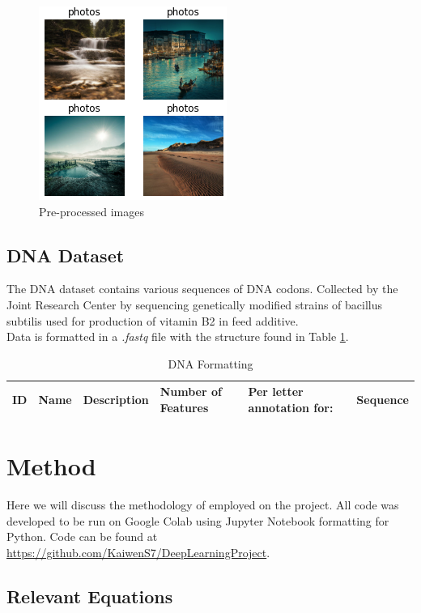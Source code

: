 \documentclass{article}
\begin{document}
	\begin{figure}[h]
		\centering
		\includegraphics[scale=1]{images/landscapes}
		\caption{Pre-processed images}
		\label{fig:landscapes}
	\end{figure}

	
	\subsection{DNA Dataset}
	The DNA dataset contains various sequences of DNA codons. Collected by the Joint Research Center by sequencing genetically modified strains of bacillus subtilis used for production of vitamin B2 in feed additive. \\
	Data is formatted in a {\em .fastq} file with the structure found in Table \ref{tab:dna}.
	
	\begin{table}
		\caption{DNA Formatting}
		\centering
		\begin{tabular}{llllll}
			\toprule
			ID     & Name     & Description & Number of Features & Per letter annotation for: & Sequence \\
			\bottomrule
		\end{tabular}
		\label{tab:dna}
	\end{table}
	
	\section{Method}
	Here we will discuss the methodology of employed on the project. All code was developed to be run on Google Colab using Jupyter Notebook formatting for Python. Code can be found at \url{https://github.com/KaiwenS7/DeepLearningProject}.

	\subsection{Relevant Equations}
\end{document}
